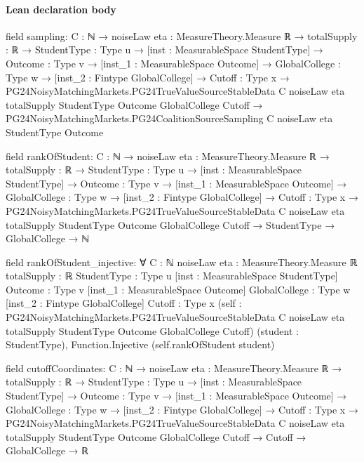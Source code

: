 \documentclass[10pt]{article}
\begin{document}
\paragraph{Lean declaration body}
\begin{ReviewVerbatim}
field sampling:
{C : ℕ} →
  {noiseLaw eta : MeasureTheory.Measure ℝ} →
    {totalSupply : ℝ} →
      {StudentType : Type u} →
        [inst : MeasurableSpace StudentType] →
          {Outcome : Type v} →
            [inst_1 : MeasurableSpace Outcome] →
              {GlobalCollege : Type w} →
                [inst_2 : Fintype GlobalCollege] →
                  {Cutoff : Type x} →
                    PG24NoisyMatchingMarkets.PG24TrueValueSourceStableData C noiseLaw eta totalSupply StudentType
                        Outcome GlobalCollege Cutoff →
                      PG24NoisyMatchingMarkets.PG24CoalitionSourceSampling C noiseLaw eta StudentType Outcome

field rankOfStudent:
{C : ℕ} →
  {noiseLaw eta : MeasureTheory.Measure ℝ} →
    {totalSupply : ℝ} →
      {StudentType : Type u} →
        [inst : MeasurableSpace StudentType] →
          {Outcome : Type v} →
            [inst_1 : MeasurableSpace Outcome] →
              {GlobalCollege : Type w} →
                [inst_2 : Fintype GlobalCollege] →
                  {Cutoff : Type x} →
                    PG24NoisyMatchingMarkets.PG24TrueValueSourceStableData C noiseLaw eta totalSupply StudentType
                        Outcome GlobalCollege Cutoff →
                      StudentType → GlobalCollege → ℕ

field rankOfStudent_injective:
∀ {C : ℕ} {noiseLaw eta : MeasureTheory.Measure ℝ} {totalSupply : ℝ} {StudentType : Type u}
  [inst : MeasurableSpace StudentType] {Outcome : Type v} [inst_1 : MeasurableSpace Outcome] {GlobalCollege : Type w}
  [inst_2 : Fintype GlobalCollege] {Cutoff : Type x}
  (self :
    PG24NoisyMatchingMarkets.PG24TrueValueSourceStableData C noiseLaw eta totalSupply StudentType Outcome GlobalCollege
      Cutoff)
  (student : StudentType), Function.Injective (self.rankOfStudent student)

field cutoffCoordinates:
{C : ℕ} →
  {noiseLaw eta : MeasureTheory.Measure ℝ} →
    {totalSupply : ℝ} →
      {StudentType : Type u} →
        [inst : MeasurableSpace StudentType] →
          {Outcome : Type v} →
            [inst_1 : MeasurableSpace Outcome] →
              {GlobalCollege : Type w} →
                [inst_2 : Fintype GlobalCollege] →
                  {Cutoff : Type x} →
                    PG24NoisyMatchingMarkets.PG24TrueValueSourceStableData C noiseLaw eta totalSupply StudentType
                        Outcome GlobalCollege Cutoff →
                      Cutoff → GlobalCollege → ℝ


\end{ReviewVerbatim}
\end{document}
